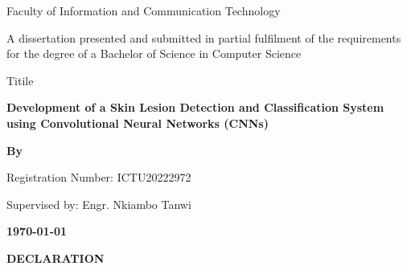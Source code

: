 \documentclass[
  12pt,
  oneside]{article}
\author{}
\date{\vspace{-2.5em}}
\begin{document}
\begin{titlepage}
    \centering
    
    
    \vspace{1cm}
    
    {\Large Faculty of Information and Communication Technology}
    
    \vspace{1.2cm}
    
    {A dissertation presented and submitted in partial fulfilment of the requirements\\
    for the degree of a Bachelor of Science in Computer Science}
    
    \vspace{0.5cm}

    {Titile}
    
    \textbf{Development of a Skin Lesion Detection and Classification System using Convolutional Neural Networks (CNNs)}
    
    \vspace{0.4cm}
    
    \textbf{By}
    
    
    \vspace{0.5cm}
    
    {Registration Number: ICTU20222972}
    
    \vspace{1cm}
    
    {Supervised by: Engr. Nkiambo Tanwi}
    
    \vspace{2cm}
    
    \textbf{\today}
    
    \vfill
\end{titlepage}
\clearpage
\thispagestyle{empty}
\begin{center}
\textbf{\large DECLARATION}
\end{center}
\end{document}
